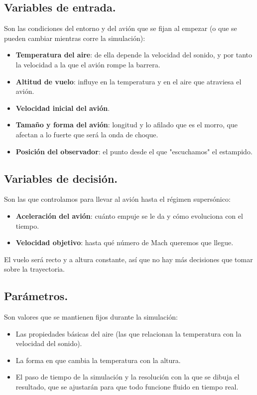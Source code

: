 \documentclass[10.5pt]{article}
\begin{document}
	\subsection{Variables de entrada.}
	
	Son las condiciones del entorno y del avión que se fijan al empezar (o que se pueden cambiar mientras corre la simulación):
	
	\begin{itemize}
		\item \textbf{Temperatura del aire}: de ella depende la velocidad del sonido, y por tanto la velocidad a la que el avión rompe la barrera.
		\item \textbf{Altitud de vuelo}: influye en la temperatura y en el aire que atraviesa el avión.
		\item \textbf{Velocidad inicial del avión}.
		\item \textbf{Tamaño y forma del avión}: longitud y lo afilado que es el morro, que afectan a lo fuerte que será la onda de choque.
		\item \textbf{Posición del observador}: el punto desde el que "escuchamos" el estampido.
	\end{itemize}
	
	\subsection{Variables de decisión.}
	
	Son las que controlamos para llevar al avión hasta el régimen supersónico:
	
	\begin{itemize}
		\item \textbf{Aceleración del avión}: cuánto empuje se le da y cómo evoluciona con el tiempo.
		\item \textbf{Velocidad objetivo}: hasta qué número de Mach queremos que llegue.
	\end{itemize}
	
	El vuelo será recto y a altura constante, así que no hay más decisiones que tomar sobre la trayectoria.
	
	\subsection{Parámetros.}
	
	Son valores que se mantienen fijos durante la simulación:
	
	\begin{itemize}
		\item Las propiedades básicas del aire (las que relacionan la temperatura con la velocidad del sonido).
		\item La forma en que cambia la temperatura con la altura.
		\item El paso de tiempo de la simulación y la resolución con la que se dibuja el resultado, que se ajustarán para que todo funcione fluido en tiempo real.
	\end{itemize}
	
\end{document}
